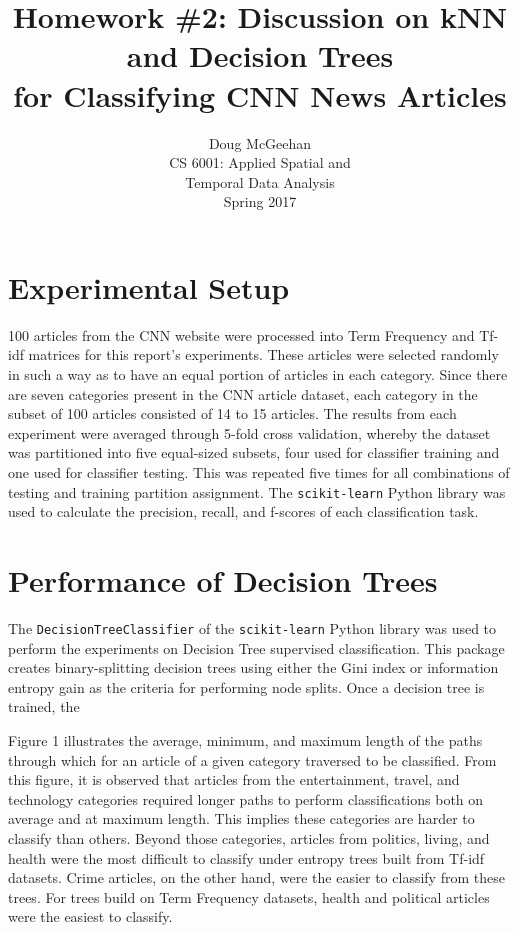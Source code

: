 \documentclass[11pt]{article}
\title{Homework \#2: Discussion on kNN and Decision Trees\\ for Classifying CNN News Articles}
\author{Doug McGeehan\\
		CS 6001: Applied Spatial and \\ Temporal Data Analysis\\
		Spring 2017}
\begin{document}
\maketitle

\section{Experimental Setup}

100 articles from the CNN website were processed into Term Frequency and Tf-idf matrices for this report's experiments.
These articles were selected randomly in such a way as to have an equal portion of articles in each category.
Since there are seven categories present in the CNN article dataset, each category in the subset of 100 articles consisted of 14 to 15 articles.
The results from each experiment were averaged through 5-fold cross validation,
 whereby the dataset was partitioned into five equal-sized subsets, four used for classifier training and one used for classifier testing.
This was repeated five times for all combinations of testing and training partition assignment.
The \texttt{scikit-learn} Python library was used to calculate the precision, recall, and f-scores of each classification task.

\section{Performance of Decision Trees}

The \texttt{DecisionTreeClassifier} of the \texttt{scikit-learn} Python library was used to perform the experiments on Decision Tree supervised classification.
This package creates binary-splitting decision trees using either the Gini index or information entropy gain as the criteria for performing node splits.
Once a decision tree is trained, the 

Figure 1 illustrates the average, minimum, and maximum length of the paths through which for an article of a given category traversed to be classified.
From this figure, it is observed that articles from the entertainment, travel, and technology categories required longer paths to perform classifications both on average and at maximum length.
This implies these categories are harder to classify than others.
Beyond those categories, articles from politics, living, and health were the most difficult to classify under entropy trees built from Tf-idf datasets.
Crime articles, on the other hand, were the easier to classify from these trees.
For trees build on Term Frequency datasets, health and political articles were the easiest to classify.
\end{document}
